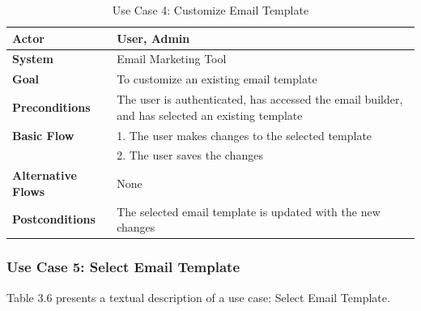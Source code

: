 \begin{table}[ht]
	\centering
	\begin{tabularx}{\textwidth}{|l|X|}
		\hline
		\textbf{Actor}             & User, Admin                                                                                      \\
		\hline
		\textbf{System}            & Email Marketing Tool                                                                             \\
		\hline
		\textbf{Goal}              & To customize an existing email template                                                          \\
		\hline
		\textbf{Preconditions}     & The user is authenticated, has accessed the email builder, and has selected an existing template \\
		\hline
		\textbf{Basic Flow}        & 1. The user makes changes to the selected template                                               \\
		                           & 2. The user saves the changes                                                                    \\
		\hline
		\textbf{Alternative Flows} & None                                                                                             \\
		\hline
		\textbf{Postconditions}    & The selected email template is updated with the new changes                                      \\
		\hline
	\end{tabularx}
	\caption{Use Case 4: Customize Email Template}
	\label{tab:Use Case 4 Customize Email Template}
\end{table}

\clearpage

\subsubsection{Use Case 5: Select Email Template}

Table 3.6 presents a textual description of a use case: Select Email Template.

